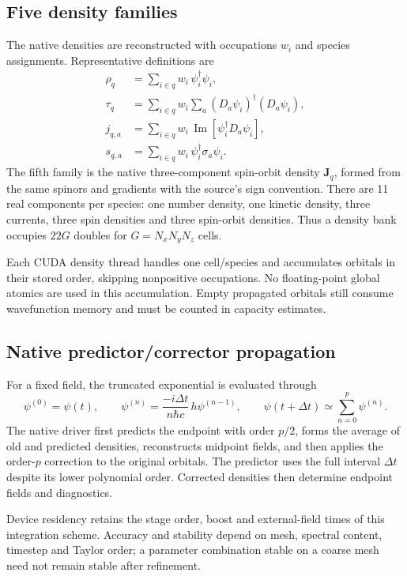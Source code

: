 \documentclass[11pt,a4paper]{article}
\begin{document}
\subsection{Five density families}
The native densities are reconstructed with occupations $w_i$ and species
assignments. Representative definitions are
\begin{align}
 \rho_q&=\sum_{i\in q}w_i\,\psi_i^\dagger\psi_i,\\
 \tau_q&=\sum_{i\in q}w_i\sum_a(D_a\psi_i)^\dagger(D_a\psi_i),\\
 j_{q,a}&=\sum_{i\in q}w_i\,\operatorname{Im}
               [\psi_i^\dagger D_a\psi_i],\\
 s_{q,a}&=\sum_{i\in q}w_i\,\psi_i^\dagger\sigma_a\psi_i.
\end{align}
The fifth family is the native three-component spin-orbit density $\mathbf J_q$,
formed from the same spinors and gradients with the source's sign convention.
There are 11 real components per species: one number density, one kinetic
density, three currents, three spin densities and three spin-orbit densities.
Thus a density bank occupies $22G$ doubles for $G=N_xN_yN_z$ cells.

Each CUDA density thread handles one cell/species and accumulates orbitals
in their stored order, skipping nonpositive occupations. No floating-point
global atomics are used in this accumulation. Empty propagated orbitals still
consume wavefunction memory and must be counted in capacity estimates.

\subsection{Native predictor/corrector propagation}
For a fixed field, the truncated exponential is evaluated through
\begin{equation}
 \psi^{(0)}=\psi(t),\qquad
 \psi^{(n)}=\frac{-i\Delta t}{n\hbar c}\,h\psi^{(n-1)},\qquad
 \psi(t+\Delta t)\simeq\sum_{n=0}^{p}\psi^{(n)}.
 \label{eq:taylor}
\end{equation}
The native driver first predicts the endpoint with order $p/2$, forms
the average of old and predicted densities, reconstructs midpoint fields,
and then applies the order-$p$ correction to the original orbitals. The
predictor uses the full interval $\Delta t$ despite its lower polynomial order.
Corrected densities then determine endpoint fields and diagnostics.

Device residency retains the stage order, boost and external-field times
of this integration scheme. Accuracy and
stability depend on mesh, spectral content, timestep and Taylor order; a
parameter combination stable on a coarse mesh need not remain stable after
refinement.
\end{document}
